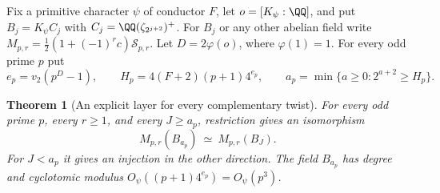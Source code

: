 \documentclass[a4paper,11pt]{article}
\newtheorem{theorem}[proposition]{Theorem}
\theoremstyle{definition}
\theoremstyle{remark}
\numberwithin{equation}{section}
\newcommand{\Sel}{\mathcal S}
\begin{document}
Fix a primitive character \(\psi\) of conductor \(F\), let
\(o=[K_\psi:\QQ]\), and put \(B_j=K_\psi C_j\) with
\(C_j=\QQ(\zeta_{2^{j+2}})^+\). For \(B_j\) or any other
abelian field write \(M_{p,r}=\tfrac12(1+(-1)^r c)\Sel_{p,r}\).
Let \(D=2\varphi(o)\), where \(\varphi(1)=1\). For every odd
prime \(p\) put
\begin{equation}
 e_p=v_2(p^D-1),\qquad
 H_p=4(F+2)(p+1)4^{e_p},\qquad
 a_p=\min\{a\ge0:2^{a+2}\ge H_p\}.
 \label{eq:level146}
\end{equation}

\begin{theorem}[An explicit layer for every complementary twist]
\label{thm:effect146}
For every odd prime \(p\), every \(r\ge1\), and every \(J\ge a_p\),
restriction gives an isomorphism
\[
                      M_{p,r}(B_{a_p})\ \simeq\ M_{p,r}(B_J).
\]
For \(J<a_p\) it gives an injection in the other direction.
The field \(B_{a_p}\) has degree and cyclotomic modulus
\(O_\psi((p+1)4^{e_p})=O_\psi(p^3)\).
\end{theorem}
\end{document}
